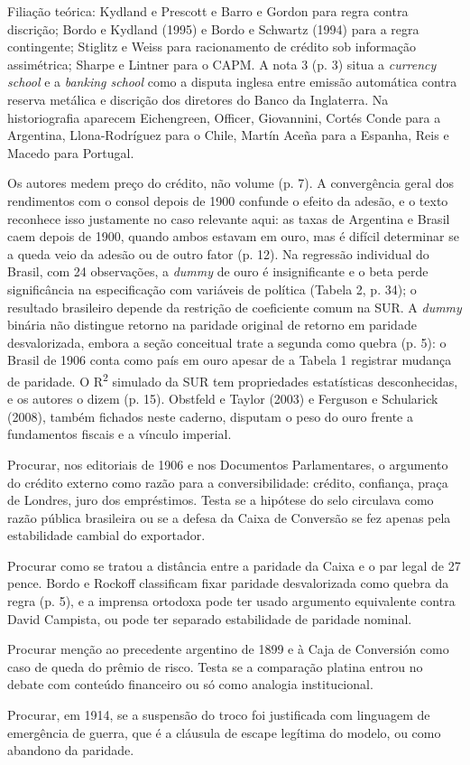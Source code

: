 Filiação teórica: Kydland e Prescott e Barro e Gordon para regra contra
discrição; Bordo e Kydland (1995) e Bordo e Schwartz (1994) para a regra
contingente; Stiglitz e Weiss para racionamento de crédito sob informação
assimétrica; Sharpe e Lintner para o CAPM. A nota 3 (p. 3) situa a
\emph{currency school} e a \emph{banking school} como a disputa inglesa entre
emissão automática contra reserva metálica e discrição dos diretores do Banco da
Inglaterra. Na historiografia aparecem Eichengreen, Officer, Giovannini, Cortés
Conde para a Argentina, Llona-Rodríguez para o Chile, Martín Aceña para a
Espanha, Reis e Macedo para Portugal.

Os autores medem preço do crédito, não volume (p. 7). A convergência geral dos
rendimentos com o consol depois de 1900 confunde o efeito da adesão, e o texto
reconhece isso justamente no caso relevante aqui: as taxas de Argentina e Brasil
caem depois de 1900, quando ambos estavam em ouro, mas é difícil determinar se a
queda veio da adesão ou de outro fator (p. 12). Na regressão individual do
Brasil, com 24 observações, a \emph{dummy} de ouro é insignificante e o beta
perde significância na especificação com variáveis de política (Tabela 2,
p. 34); o resultado brasileiro depende da restrição de coeficiente comum na SUR.
A \emph{dummy} binária não distingue retorno na paridade original de retorno em
paridade desvalorizada, embora a seção conceitual trate a segunda como quebra
(p. 5): o Brasil de 1906 conta como país em ouro apesar de a Tabela 1 registrar
mudança de paridade. O R\textsuperscript{2} simulado da SUR tem propriedades
estatísticas desconhecidas, e os autores o dizem (p. 15). Obstfeld e Taylor
(2003) e Ferguson e Schularick (2008), também fichados neste caderno, disputam o
peso do ouro frente a fundamentos fiscais e a vínculo imperial.

\begin{dialogo}
\item Procurar, nos editoriais de 1906 e nos Documentos Parlamentares, o
argumento do crédito externo como razão para a conversibilidade: crédito,
confiança, praça de Londres, juro dos empréstimos. Testa se a hipótese do selo
circulava como razão pública brasileira ou se a defesa da Caixa de Conversão se
fez apenas pela estabilidade cambial do exportador.
\item Procurar como se tratou a distância entre a paridade da Caixa e o par
legal de 27 pence. Bordo e Rockoff classificam fixar paridade desvalorizada como
quebra da regra (p. 5), e a imprensa ortodoxa pode ter usado argumento
equivalente contra David Campista, ou pode ter separado estabilidade de paridade
nominal.
\item Procurar menção ao precedente argentino de 1899 e à Caja de Conversión
como caso de queda do prêmio de risco. Testa se a comparação platina entrou no
debate com conteúdo financeiro ou só como analogia institucional.
\item Procurar, em 1914, se a suspensão do troco foi justificada com linguagem
de emergência de guerra, que é a cláusula de escape legítima do modelo, ou como
abandono da paridade.
\end{dialogo}

